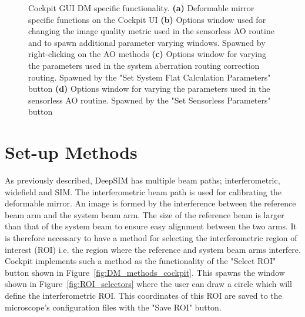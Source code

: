 \begin{figure}[H]
\begin{subfigure}{0.35\textwidth}
	\end{subfigure}
	\caption[Cockpit GUI DM specific functionality]{Cockpit GUI DM specific functionality. \textbf{(a)} Deformable mirror specific functions on the Cockpit UI \textbf{(b)} Options window used for changing the image quality metric used in the sensorless AO routine and to spawn additional parameter varying windows. Spawned by right-clicking on the AO methods \textbf{(c)} Options window for varying the parameters used in the system aberration routing correction routing. Spawned by the "Set System Flat Calculation Parameters" button \textbf{(d)} Options window for varying the parameters used in the sensorless AO routine. Spawned by the "Set Sensorless Parameters" button}
	\label{fig:DeepSIM_control_software}
\end{figure}

\section{Set-up Methods}
\label{sec:set_up_methods}

As previously described, DeepSIM has multiple beam paths; interferometric, widefield and SIM. The interferometric beam path is used for calibrating the deformable mirror. An image is formed by the interference between the reference beam arm and the system beam arm. The size of the reference beam is larger than that of the system beam to ensure easy alignment between the two arms. It is therefore necessary to have a method for selecting the interferometric region of interest (ROI) i.e. the region where the reference and system beam arms interfere. Cockpit implements such a method as the functionality of the "Select ROI" button shown in Figure~\ref{fig:DM_methods_cockpit}. This spawns the window shown in Figure~\ref{fig:ROI_selectors} where the user can draw a circle which will define the interferometric ROI. This coordinates of this ROI are saved to the microscope's configuration files with the "Save ROI" button.

